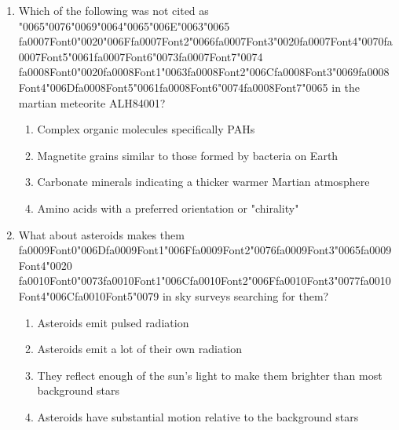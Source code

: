 \documentclass[12pt]{article}
\begin{document}
\begin{enumerate}[label=\arabic*.]
\begin{enumerate}[label=(\alph*)]
    \item dark lavas filling older impact basins
    \item the bright regions on the Moon
\end{enumerate}
\item Which of the following was not cited as {\char"0065}{\char"0076}{\char"0069}{\char"0064}{\char"0065}{\char"006E}{\char"0063}{\char"0065} {\csname fa0007Font0\endcsname\char"0020}{\char"006F}{\csname fa0007Font2\endcsname\char"0066}{\csname fa0007Font3\endcsname\char"0020}{\csname fa0007Font4\endcsname\char"0070}{\csname fa0007Font5\endcsname\char"0061}{\csname fa0007Font6\endcsname\char"0073}{\csname fa0007Font7\endcsname\char"0074} {\csname fa0008Font0\endcsname\char"0020}{\csname fa0008Font1\endcsname\char"0063}{\csname fa0008Font2\endcsname\char"006C}{\csname fa0008Font3\endcsname\char"0069}{\csname fa0008Font4\endcsname\char"006D}{\csname fa0008Font5\endcsname\char"0061}{\csname fa0008Font6\endcsname\char"0074}{\csname fa0008Font7\endcsname\char"0065} in the martian meteorite
ALH84001?
\begin{enumerate}[label=(\alph*)]
    \item Complex organic molecules specifically PAHs
    \item Magnetite grains similar to those formed by bacteria on Earth
    \item Carbonate minerals indicating a thicker warmer Martian atmosphere
    \item Amino acids with a preferred orientation or "chirality"
\end{enumerate}
\item What about asteroids makes them {\csname fa0009Font0\endcsname\char"006D}{\csname fa0009Font1\endcsname\char"006F}{\csname fa0009Font2\endcsname\char"0076}{\csname fa0009Font3\endcsname\char"0065}{\csname fa0009Font4\endcsname\char"0020} {\csname fa0010Font0\endcsname\char"0073}{\csname fa0010Font1\endcsname\char"006C}{\csname fa0010Font2\endcsname\char"006F}{\csname fa0010Font3\endcsname\char"0077}{\csname fa0010Font4\endcsname\char"006C}{\csname fa0010Font5\endcsname\char"0079} in sky surveys searching for them?
\begin{enumerate}[label=(\alph*)]
    \item Asteroids emit pulsed radiation
    \item Asteroids emit a lot of their own radiation
    \item They reflect enough of the sun's light to make them brighter than most background stars
    \item Asteroids have substantial motion relative to the background stars

\end{enumerate}
\end{enumerate}
\end{document}

